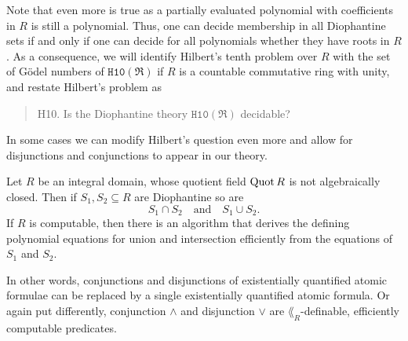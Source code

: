 Note that even more is true as a partially evaluated polynomial with
coefficients in \(R\) is still a polynomial. Thus, one can decide membership in
all Diophantine sets if and only if one can decide for all polynomials whether
they have roots in \(R\). As a consequence, we will identify Hilbert's tenth
problem over \(R\) with the set of Gödel numbers of
\(\mathtt{H10}(\mathfrak{R})\) if \(R\) is a countable commutative ring with
unity, and restate Hilbert's problem as
\begin{quote}
  \textsc{H10.} Is the Diophantine theory \(\mathtt{H10}(\mathfrak{R})\)
  decidable?
\end{quote}
In some cases we can modify Hilbert's question even more and allow for
disjunctions and conjunctions to appear in our theory.

\begin{lem}\label{lem:intersections and unions}
    Let \(R\) be an integral domain, whose quotient field \(\operatorname{Quot} R\) is not
    algebraically closed. Then if \(S_1, S_2 \subseteq R\) are Diophantine so
    are
    \[
      S_1 ∩ S_2 \quad \text{and} \quad S_1 ∪ S_2.
    \]
    If \(R\) is computable, then there is an algorithm that derives the defining
    polynomial equations for union and intersection efficiently from the
    equations of \(S_1\) and \(S_2\).
\end{lem}

In other words, conjunctions and disjunctions of existentially quantified atomic
formulae can be replaced by a single existentially quantified atomic formula. Or
again put differently, conjunction \(∧\) and disjunction \(∨\) are
\(\lang_R\)-definable, efficiently computable predicates.

